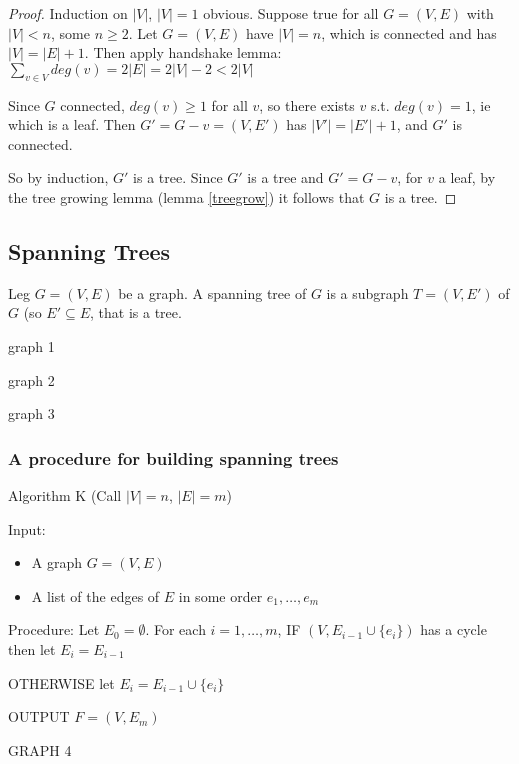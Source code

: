 \documentclass{article}
\begin{document}
\begin{proof}
Induction on $|V|$, $|V|=1$ obvious.  Suppose true for all $G=(V,E)$ with $|V| <n$, some $n \geq 2$.  Let $G=(V,E)$ have $|V| = n$, which is connected and has $|V|=|E|+1$.  Then apply handshake lemma:  $\displaystyle \sum_{v \in V} deg(v) = 2 |E| = 2|V| - 2 <2|V|$

Since $G$ connected, $deg(v) \geq 1$ for all $v$, so there exists $v$ s.t. $deg(v)=1$, ie which is a leaf.  Then $G'= G -v = (V,E')$ has $|V'|=|E'| +1$, and $G'$ is connected.

So by induction, $G'$ is a tree.  Since $G'$ is a tree and $G'= G -v $, for $v$ a leaf, by the tree growing lemma (lemma \ref{treegrow}) it follows that $G$ is a tree.
\end{proof}

\subsection*{Spanning Trees}

\begin{defn}
Leg $G = (V,E)$ be a graph.  A spanning tree of $G$ is a subgraph $T=(V,E')$ of $G$  (so $E' \subseteq E$, that is a tree.
\end{defn}

\begin{examp}
graph 1

graph 2

graph 3
\end{examp}

\subsubsection*{A procedure for building spanning trees}

Algorithm K (Call $|V|=n$, $|E|=m$)


Input: 
\begin{itemize}
\item A graph $G=(V,E)$
\item A list of the edges of $E$ in some order $e_1, \ldots, e_m$
\end{itemize}

Procedure: Let $E_0 = \emptyset$.  For each $i = 1, \ldots, m$, IF $(V, E_{i-1} \cup \{e_i\})$ has a cycle then let $E_i = E_{i-1}$

OTHERWISE let $E_i = E_{i-1} \cup \{e_i\}$

OUTPUT $F=(V,E_m)$

GRAPH 4
\end{document}
